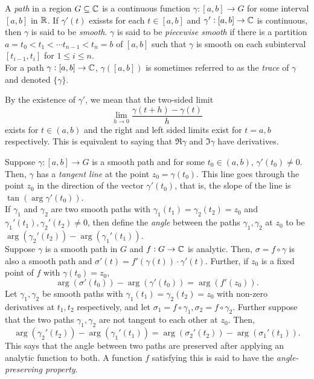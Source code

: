 	\begin{fdef}
		A \emph{path} in a region $G \subseteq \mathbb{C}$ is a continuous function $\gamma:[a,b]\to G$ for some interval $[a,b]$ in $\mathbb{R}$. If $\gamma'(t)$ exissts for each $t \in [a,b]$ and $\gamma':[a,b]\to\mathbb{C}$ is continuous, then $\gamma$ is said to be \emph{smooth}. $\gamma$ is said to be \emph{piecewise smooth} if there is a partition $a=t_0 < t_1 < \cdots t_{n-1} < t_n = b$ of $[a,b]$ such that $\gamma$ is smooth on each subinterval $[t_{i-1},t_i]$ for $1\le i\le n$.\\
		For a path $\gamma : [a,b] \to \mathbb{C}$, $\gamma([a,b])$ is sometimes referred to as the \emph{trace} of $\gamma$ and denoted $\{\gamma\}$.
	\end{fdef}

	By the existence of $\gamma'$, we mean that the two-sided limit
	\[ \lim_{h\to 0} \frac{\gamma(t+h)-\gamma(t)}{h} \]
	exists for $t \in (a,b)$ and the right and left sided limits exist for $t = a,b$ respectively. This is equivalent to saying that $\Re \gamma$ and $\Im \gamma$ have derivatives.

	Suppose $\gamma : [a,b] \to G$ is a smooth path and for some $t_0 \in (a,b)$, $\gamma'(t_0) \ne 0$. Then, $\gamma$ has a \emph{tangent line} at the point $z_0 = \gamma(t_0)$. This line goes through the point $z_0$ in the direction of the vector $\gamma'(t_0)$, that is, the slope of the line is $\tan(\arg \gamma'(t_0))$.\\

	If $\gamma_1$ and $\gamma_2$ are two smooth paths with $\gamma_1(t_1) = \gamma_2(t_2) = z_0$ and $\gamma_1'(t_1),\gamma_2'(t_2) \ne 0$, then define the \emph{angle} between the paths $\gamma_1,\gamma_2$ at $z_0$ to be $\arg(\gamma_2'(t_2)) - \arg(\gamma_1'(t_1))$.\\

	Suppose $\gamma$ is a smooth path in $G$ and $f:G\to\mathbb{C}$ is analytic. Then, $\sigma = f \circ \gamma$ is also a smooth path and $\sigma'(t) = f'(\gamma(t)) \cdot \gamma'(t)$. Further, if $z_0$ is a fixed point of $f$ with $\gamma(t_0) = z_0$,
	\[ \arg(\sigma'(t_0)) - \arg(\gamma'(t_0)) = \arg(f'(z_0)). \]
	Let $\gamma_1,\gamma_2$ be smooth paths with $\gamma_1(t_1) = \gamma_2(t_2) = z_0$ with non-zero derivatives at $t_1,t_2$ respectively, and let $\sigma_1 = f \circ \gamma_1, \sigma_2 = f \circ \gamma_2$. Further suppose that the two paths $\gamma_1,\gamma_2$ are not tangent to each other at $z_0$. Then,
	\[ \arg(\gamma_2'(t_2)) - \arg(\gamma_1'(t_1)) = \arg(\sigma_2'(t_2)) - \arg(\sigma_1'(t_1)). \]
	This says that the angle between two paths are preserved after applying an analytic function to both. A function $f$ satisfying this is said to have the \emph{angle-preserving property}.

